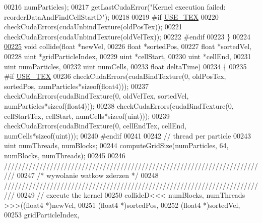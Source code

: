 \begin{DoxyCode}
00216             numParticles);
00217         getLastCudaError(\textcolor{stringliteral}{"Kernel execution failed: reorderDataAndFindCellStartD"});
00218 
00219 \textcolor{preprocessor}{#}\textcolor{preprocessor}{if} \hyperlink{particles__kernel_8cuh_a0ab211ca35e2616c721fcf2dd4f99c83}{USE\_TEX}
00220         checkCudaErrors(cudaUnbindTexture(oldPosTex));
00221         checkCudaErrors(cudaUnbindTexture(oldVelTex));
00222 \textcolor{preprocessor}{#}\textcolor{preprocessor}{endif}
00223     \}
00224 
\hypertarget{particle_system__cuda_8cu_source_l00225}{}\hyperlink{particle_system__cuda_8cu_ad9d704d76ddff93e75ca7d39f57bbced}{00225}     \textcolor{keywordtype}{void} collide(\textcolor{keywordtype}{float} *newVel,
00226                  \textcolor{keywordtype}{float} *sortedPos,
00227                  \textcolor{keywordtype}{float} *sortedVel,
00228                  uint  *gridParticleIndex,
00229                  uint  *cellStart,
00230                  uint  *cellEnd,
00231                  uint   numParticles,
00232                  uint   numCells,
00233                                  \textcolor{keywordtype}{float} deltaTime)
00234     \{
00235 \textcolor{preprocessor}{#}\textcolor{preprocessor}{if} \hyperlink{particles__kernel_8cuh_a0ab211ca35e2616c721fcf2dd4f99c83}{USE\_TEX}
00236         checkCudaErrors(cudaBindTexture(0, oldPosTex, sortedPos, numParticles*\textcolor{keyword}{sizeof}(float4)));
00237         checkCudaErrors(cudaBindTexture(0, oldVelTex, sortedVel, numParticles*\textcolor{keyword}{sizeof}(float4)));
00238         checkCudaErrors(cudaBindTexture(0, cellStartTex, cellStart, numCells*\textcolor{keyword}{sizeof}(uint)));
00239         checkCudaErrors(cudaBindTexture(0, cellEndTex, cellEnd, numCells*\textcolor{keyword}{sizeof}(uint)));
00240 \textcolor{preprocessor}{#}\textcolor{preprocessor}{endif}
00241 
00242         \textcolor{comment}{// thread per particle}
00243         uint numThreads, numBlocks;
00244         computeGridSize(numParticles, 64, numBlocks, numThreads);
00245 
00246 \textcolor{comment}{///////////////////////////////////////////////////////////////////////////}
00247 \textcolor{comment}{/*      wywolanie watkow zderzen        */}
00248 \textcolor{comment}{///////////////////////////////////////////////////////////////////////////}
00249         \textcolor{comment}{// execute the kernel}
00250         collideD<<< numBlocks, numThreads >>>((float4 *)newVel,
00251                                               (float4 *)sortedPos,
00252                                               (float4 *)sortedVel,
00253                                               gridParticleIndex,

\end{DoxyCode}
